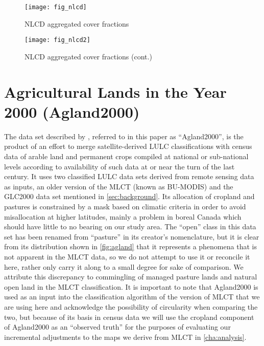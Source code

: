 \begin{figure}[htp] 
  \centering
  
  \texttt{[image: fig\_nlcd]}
\caption{NLCD aggregated cover fractions}
\label{fig:nlcd}
\end{figure} 

\begin{figure}[htp] 
  \centering
  
  \texttt{[image: fig\_nlcd2]}
\caption{NLCD aggregated cover fractions (cont.)}
\label{fig:nlcd2}
\end{figure} 

\clearpage

\section{Agricultural Lands in the Year 2000 (Agland2000)}
\label{sec:agland2000}


The data set described by \citet{Ramankutty2008}, referred to in this
paper as ``Agland2000'', is the product of an effort to merge
satellite-derived LULC classifications with census data of arable land
and permanent crops compiled at national or sub-national levels
according to availability of such data at or near the turn of the last
century.  It uses two classified LULC data sets derived from remote
sensing data as inputs, an older version of the MLCT (known as
BU-MODIS) and the GLC2000 data set mentioned in
\autoref{sec:background}.  Its allocation of cropland and pastures is
constrained by a mask based on climatic criteria in order to avoid
misallocation at higher latitudes, mainly a problem in boreal Canada
which should have little to no bearing on our study area.  The
``open'' class in this data set has been renamed from ``pasture'' in
its creator's nomenclature, but it is clear from its distribution
shown in \autoref{fig:agland} that it represents a phenomena that is
not apparent in the MLCT data, so we do not attempt to use it or
reconcile it here, rather only carry it along to a small degree for
sake of comparison.  We attribute this discrepancy to commingling of
managed pasture lands and natural open land in the MLCT
classification.  It is important to note that Agland2000 is used as an
input into the classification algorithm of the version of MLCT that we
are using here and acknowledge the possibility of circularity when
comparing the two, but because of its basis in census data we will use
the cropland component of Agland2000 as an ``observed truth'' for the
purposes of evaluating our incremental adjustments to the maps we
derive from MLCT in \autoref{cha:analysis}.
  
